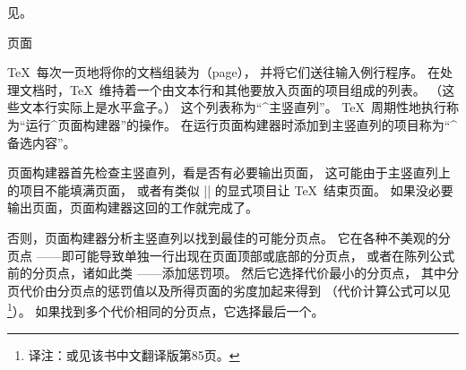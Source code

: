 {{{{{%

{}
见。
\endconcept


\concept 页面

\TeX\ 每次一页地将你的文档组装为（page），
并将它们送往输入例行程序。
在处理文档时，\TeX\ 维持着一个由文本行和其他要放入页面的项目组成的列表。%
（这些文本行实际上是水平盒子。）
这个列表称为“^{主竖直列}”。
\TeX\ 周期性地执行称为“运行^{页面构建器}”的操作。
在运行页面构建器时添加到主竖直列的项目称为“^{备选内容}”。

页面构建器首先检查主竖直列，看是否有必要输出页面，
这可能由于主竖直列上的项目不能填满页面，
或者有类似 |\eject| \ctsref\eject 的显式项目让 \TeX\ 结束页面。
如果没必要输出页面，页面构建器这回的工作就完成了。

否则，页面构建器分析主竖直列以找到最佳的可能分页点。
它在各种不美观的分页点
——即可能导致单独一行出现在页面顶部或底部的分页点，
或者在陈列公式前的分页点，诸如此类
——添加惩罚项。
然后它选择代价最小的分页点，
其中分页代价由分页点的惩罚值以及所得页面的劣度加起来得到
（代价计算公式可以见
\footnote{译注：或见该书中文翻译版第85页。}）。
如果找到多个代价相同的分页点，它选择最后一个。

}}}}}

